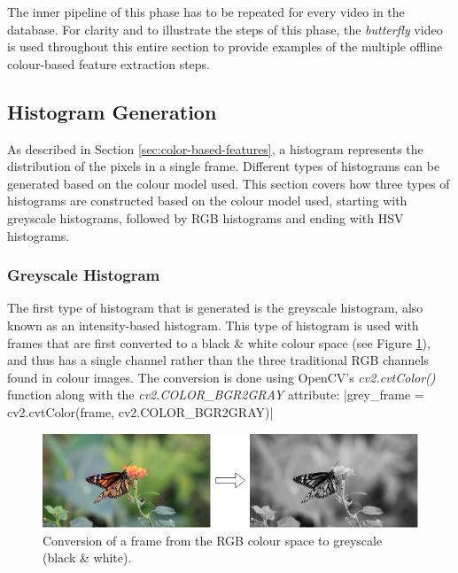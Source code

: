 The inner pipeline of this phase has to be repeated for every video in the database. For clarity and to illustrate the steps of this phase, the \textit{butterfly} video is used throughout this entire section to provide examples of the multiple offline colour-based feature extraction steps.


\subsection{Histogram Generation}

As described in Section \ref{sec:color-based-features}, a histogram represents the distribution of the pixels in a single frame. Different types of histograms can be generated based on the colour model used. This section covers how three types of histograms are constructed based on the colour model used, starting with greyscale histograms, followed by RGB histograms and ending with HSV histograms.


\subsubsection{Greyscale Histogram}

The first type of histogram that is generated is the greyscale histogram, also known as an intensity-based histogram. This type of histogram is used with frames that are first converted to a black \& white colour space (see Figure \ref{fig:rgb_to_greyscale}), and thus has a single channel rather than the three traditional RGB channels found in colour images. The conversion is done using OpenCV's \textit{cv2.cvtColor()} function along with the \textit{cv2.COLOR\_BGR2GRAY} attribute: 
|grey_frame = cv2.cvtColor(frame, cv2.COLOR_BGR2GRAY)|

\begin{figure}[h] 
\centerline{\includegraphics[width=\textwidth]{figures/implementation/rgb_to_greyscale.png}}
\caption{\label{fig:rgb_to_greyscale}Conversion of a frame from the RGB colour space to greyscale (black \& white).}
\end{figure}


